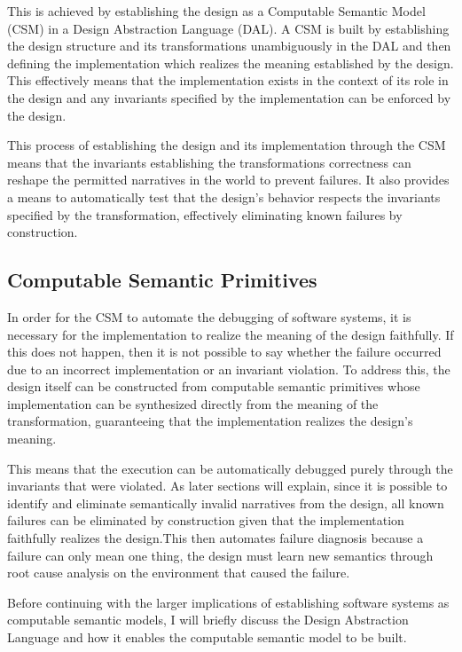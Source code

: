 \documentclass{article}
\begin{document}
This is achieved by establishing the design as a Computable Semantic Model (CSM) in a Design Abstraction Language (DAL). A CSM is built by establishing the design structure and its transformations unambiguously in the DAL and then defining the implementation which realizes the meaning established by the design. This effectively means that the implementation exists in the context of its role in the design and any invariants specified by the implementation can be enforced by the design.

This process of establishing the design and its implementation through the CSM means that the invariants establishing the transformations correctness can reshape the permitted narratives in the world to prevent failures. It also provides a means to automatically test that the design's behavior respects the invariants specified by the transformation, effectively eliminating known failures by construction.

\subsection{Computable Semantic Primitives}

In order for the CSM to automate the debugging of software systems, it is necessary for the implementation to realize the meaning of the design faithfully. If this does not happen, then it is not possible to say whether the failure occurred due to an incorrect implementation or an invariant violation. To address this, the design itself can be constructed from computable semantic primitives whose implementation can be synthesized directly from the meaning of the transformation, guaranteeing that the implementation realizes the design's meaning.

This means that the execution can be automatically debugged purely through the invariants that were violated. As later sections will explain, since it is possible to identify and eliminate semantically invalid narratives from the design, all known failures can be eliminated by construction given that the implementation faithfully realizes the design.This then automates failure diagnosis because a failure can only mean one thing, the design must learn new semantics through root cause analysis on the environment that caused the failure.

Before continuing with the larger implications of establishing software systems as computable semantic models, I will briefly discuss the Design Abstraction Language and how it enables the computable semantic model to be built.
\end{document}
